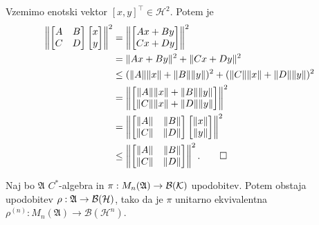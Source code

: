 \begin{dokaz}
    Vzemimo enotski vektor $[x, y]^\top \in \mathcal{H}^2$. Potem je 
        \begin{align*}
            \left\|
            \begin{bmatrix}
                A & B\\
                C & D
            \end{bmatrix} \begin{bmatrix}
                x \\ y
            \end{bmatrix} \right\|^2 &= \left\| \begin{bmatrix}
                A x + B y\\  Cx + Dy
            \end{bmatrix} \right\|^2 \\
            &= \| A x + B y \|^2 + \| Cx + Dy \|^2 \\
            &\leq (\| A\| \| x\| + \| B\| \| y\|)^2 + (\| C\| \| x\| + \| D\| \| y\|)^2 \\
            &= \left\| \begin{bmatrix}
                \| A\| \| x\| + \| B\| \| y\| \\ \| C\| \| x\| + \| D\| \| y\|
            \end{bmatrix} \right\|^2\\
            &= \left\| \begin{bmatrix}
                \| A\| & \| B\|\\
                \| C\| & \| D\|
            \end{bmatrix} \begin{bmatrix}
                \| x\| \\ \| y\|
            \end{bmatrix} \right\|^2\\
            &\leq \left\| \begin{bmatrix}
                \| A\| & \| B\|\\
                \| C\| & \| D\|
            \end{bmatrix} \right\|^2. \qedhere
        \end{align*}
\end{dokaz}

\begin{lema}\label{lem:3.1}
    Naj bo $\mathfrak{A}$ $C^*$-algebra in $\pi: M_n (\mathfrak{A}) \to \operatorname{\mathcal{B} (\mathcal{K})}$ upodobitev.
    Potem obstaja upodobitev $\rho: \mathfrak{A} \to \operatorname{\mathcal{B} (\mathcal{H})}$, tako da je  
    $\pi$ unitarno ekvivalentna $\rho^{(n)}: M_n (\mathfrak{A}) \to \mathcal{B}(\mathcal{H}^n)$.
\end{lema} 

